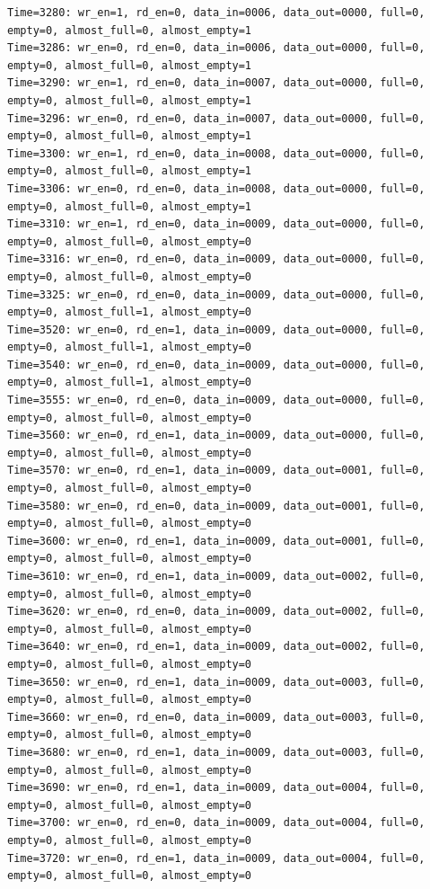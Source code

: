 \documentclass[UTF8]{ctexart}
\begin{document}
\begin{lstlisting}[frame=shadowbox]
Time=3280: wr_en=1, rd_en=0, data_in=0006, data_out=0000, full=0, empty=0, almost_full=0, almost_empty=1
Time=3286: wr_en=0, rd_en=0, data_in=0006, data_out=0000, full=0, empty=0, almost_full=0, almost_empty=1
Time=3290: wr_en=1, rd_en=0, data_in=0007, data_out=0000, full=0, empty=0, almost_full=0, almost_empty=1
Time=3296: wr_en=0, rd_en=0, data_in=0007, data_out=0000, full=0, empty=0, almost_full=0, almost_empty=1
Time=3300: wr_en=1, rd_en=0, data_in=0008, data_out=0000, full=0, empty=0, almost_full=0, almost_empty=1
Time=3306: wr_en=0, rd_en=0, data_in=0008, data_out=0000, full=0, empty=0, almost_full=0, almost_empty=1
Time=3310: wr_en=1, rd_en=0, data_in=0009, data_out=0000, full=0, empty=0, almost_full=0, almost_empty=0
Time=3316: wr_en=0, rd_en=0, data_in=0009, data_out=0000, full=0, empty=0, almost_full=0, almost_empty=0
Time=3325: wr_en=0, rd_en=0, data_in=0009, data_out=0000, full=0, empty=0, almost_full=1, almost_empty=0
Time=3520: wr_en=0, rd_en=1, data_in=0009, data_out=0000, full=0, empty=0, almost_full=1, almost_empty=0
Time=3540: wr_en=0, rd_en=0, data_in=0009, data_out=0000, full=0, empty=0, almost_full=1, almost_empty=0
Time=3555: wr_en=0, rd_en=0, data_in=0009, data_out=0000, full=0, empty=0, almost_full=0, almost_empty=0
Time=3560: wr_en=0, rd_en=1, data_in=0009, data_out=0000, full=0, empty=0, almost_full=0, almost_empty=0
Time=3570: wr_en=0, rd_en=1, data_in=0009, data_out=0001, full=0, empty=0, almost_full=0, almost_empty=0
Time=3580: wr_en=0, rd_en=0, data_in=0009, data_out=0001, full=0, empty=0, almost_full=0, almost_empty=0
Time=3600: wr_en=0, rd_en=1, data_in=0009, data_out=0001, full=0, empty=0, almost_full=0, almost_empty=0
Time=3610: wr_en=0, rd_en=1, data_in=0009, data_out=0002, full=0, empty=0, almost_full=0, almost_empty=0
Time=3620: wr_en=0, rd_en=0, data_in=0009, data_out=0002, full=0, empty=0, almost_full=0, almost_empty=0
Time=3640: wr_en=0, rd_en=1, data_in=0009, data_out=0002, full=0, empty=0, almost_full=0, almost_empty=0
Time=3650: wr_en=0, rd_en=1, data_in=0009, data_out=0003, full=0, empty=0, almost_full=0, almost_empty=0
Time=3660: wr_en=0, rd_en=0, data_in=0009, data_out=0003, full=0, empty=0, almost_full=0, almost_empty=0
Time=3680: wr_en=0, rd_en=1, data_in=0009, data_out=0003, full=0, empty=0, almost_full=0, almost_empty=0
Time=3690: wr_en=0, rd_en=1, data_in=0009, data_out=0004, full=0, empty=0, almost_full=0, almost_empty=0
Time=3700: wr_en=0, rd_en=0, data_in=0009, data_out=0004, full=0, empty=0, almost_full=0, almost_empty=0
Time=3720: wr_en=0, rd_en=1, data_in=0009, data_out=0004, full=0, empty=0, almost_full=0, almost_empty=0

\end{lstlisting}
\end{document}
